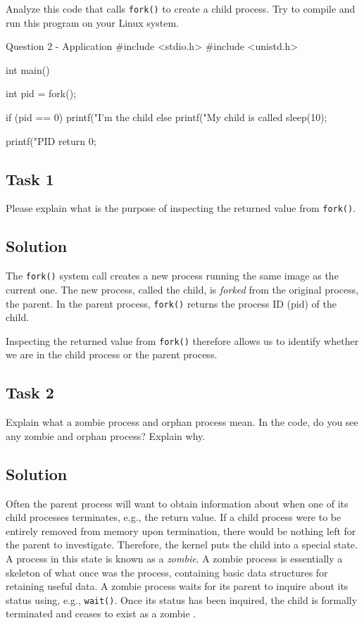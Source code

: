 \documentclass[../main.tex]{subfiles}
\begin{document}
Analyze this code that calls \lstinline{fork()} to create a child process. Try to compile and run this program on your Linux system.

\begin{cppminted}{Question 2 - Application}
#include <stdio.h>
#include <unistd.h>

int main() {
    int pid = fork();

    if (pid == 0) {
        printf("I'm the child %
    }
    else {
        printf("My child is called %
        sleep(10);
    }

    printf("PID%
    return 0;
}
\end{cppminted}

\subsection{Task 1}

Please explain what is the purpose of inspecting the returned value from \lstinline{fork()}.

\subsection*{Solution}

The \lstinline{fork()} system call creates a new process running the same image as the current one. The new process, called the child, is \textit{forked} from the original process, the parent. In the parent process, \lstinline{fork()} returns the process ID (pid) of the child.

Inspecting the returned value from \lstinline{fork()} therefore allows us to identify whether we are in the child process or the parent process.

\subsection{Task 2}

Explain what a zombie process and orphan process mean. In the code, do you see any zombie and orphan process? Explain why.

\subsection*{Solution}

Often the parent process will want to obtain information about when one of its child processes terminates, e.g., the return value. If a child process were to be entirely removed from memory upon termination, there would be nothing left for the parent to investigate. Therefore, the kernel puts the child into a special state. A process in this state is known as a \textit{zombie}. A zombie process is essentially a skeleton of what once was the process, containing basic data structures for retaining useful data. A zombie process waits for its parent to inquire about its status using, e.g., \lstinline{wait()}. Once its status has been inquired, the child is formally terminated and ceases to exist as a zombie \cite{love}.
\end{document}
